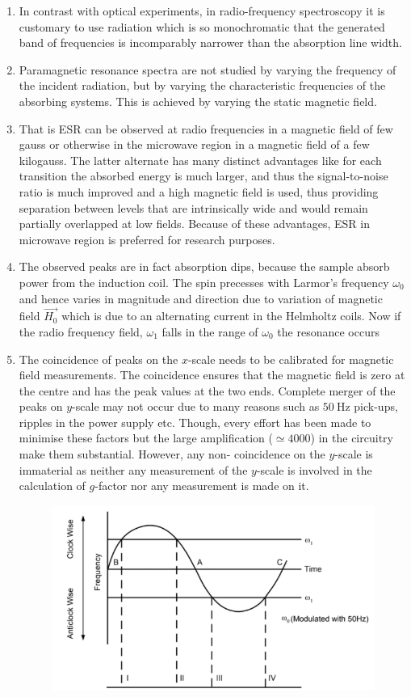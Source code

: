\documentclass[%
 reprint,
nofootinbib,
 amsmath,amssymb,
 aps,
floatfix,
]{revtex4-2}
\begin{document}
\begin{enumerate}
    \item In contrast with optical experiments, in radio-frequency spectroscopy it is customary to use radiation which is so monochromatic that the generated band of frequencies is incomparably narrower than the absorption line width. 
    \item Paramagnetic resonance spectra are not studied by varying the frequency of the incident radiation, but by varying the characteristic frequencies of the absorbing systems. This is achieved by varying the static magnetic field.
    \item That is ESR can be observed at radio frequencies in a magnetic field of few gauss or otherwise in the microwave region in a magnetic field of a few kilogauss. The latter alternate has many distinct advantages like for each transition the absorbed energy is much larger, and thus the signal-to-noise ratio is much improved and a high magnetic field is used, thus providing separation between levels that are intrinsically wide and would remain partially overlapped at low fields. Because of these advantages, ESR in microwave region is preferred for research purposes. 
    \item The observed peaks are in fact absorption dips, because the sample absorb power from the induction coil. The spin precesses with Larmor's frequency $\omega_0$ and hence varies in magnitude and direction due to variation of magnetic field $\Vec{H_0}$ which is due to an alternating current in the Helmholtz coils. Now if the radio frequency field, $\omega_1$ falls in the range of $\omega_0$ the resonance occurs
    \item The coincidence of peaks on the $x$-scale needs to be calibrated for magnetic field measurements. The coincidence ensures that the magnetic field is zero at the centre and has the peak values at the two ends. Complete merger of the peaks on $y$-scale may not occur due to many reasons such as $\SI{50}{\hertz}$ pick-ups, ripples in the power supply etc. Though, every effort has been made to minimise these factors but the large amplification ($\simeq 4000$) in the circuitry make them substantial. However, any non- coincidence on the $y$-scale is immaterial as neither any measurement of the $y$-scale is involved in the calculation of $g$-factor nor any measurement is made on it.
    \begin{figure}
        \centering
        \includegraphics[scale = 0.65]{Figures/radfreq.png}

\end{figure}
\end{enumerate}
\end{document}
